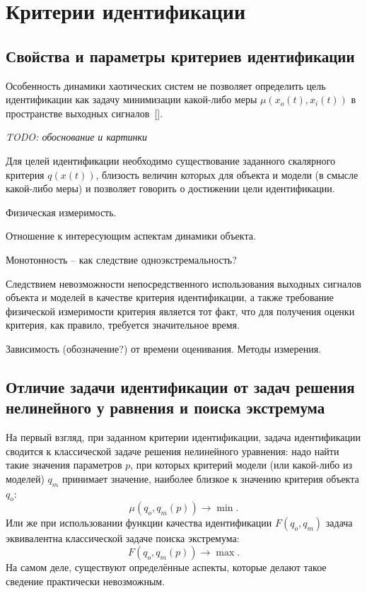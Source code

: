 \chapter{Критерии идентификации}

\section{Свойства и параметры критериев идентификации}

Особенность динамики хаотических систем не позволяет
определить цель идентификации как задачу минимизации
какой-либо меры $\mu(x_o(t),x_i(t))$ в пространстве выходных
сигналов~[].

\textit{TODO: обоснование и картинки}

Для целей идентификации необходимо существование
заданного скалярного критерия $q(x(t))$, близость величин
которых для объекта и модели (в смысле какой-либо меры)
и позволяет говорить о достижении цели идентификации.


Физическая измеримость.

Отношение к интересующим аспектам динамики объекта.

Монотонность -- как следствие одноэкстремальность?

Следствием невозможности непосредственного использования выходных
сигналов объекта и моделей в качестве критерия идентификации, а также
требование физической измеримости критерия является
тот факт, что для получения оценки критерия, как правило,
требуется значительное время.

Зависимость (обозначение?) от времени оценивания.
Методы измерения.






\section{Отличие задачи идентификации от задач решения нелинейного у равнения и поиска экстремума}

На первый взгляд, при заданном критерии идентификации, задача идентификации
сводится к классической задаче решения нелинейного уравнения: надо найти такие значения
параметров $p$, при которых критерий модели (или какой-либо из моделей)
$q_m$ принимает значение, наиболее близкое к значению критерия объекта $q_o$:
\[
  \mu( q_o, q_m(p) ) \to \min.
\]
Или же при использовании функции качества идентификации $F(q_o, q_m )$ задача
эквивалентна классической задаче поиска экстремума:
\[
  F( q_o, q_m(p) ) \to \max.
\]
На самом деле, существуют определённые аспекты, которые делают такое
сведение практически невозможным.

